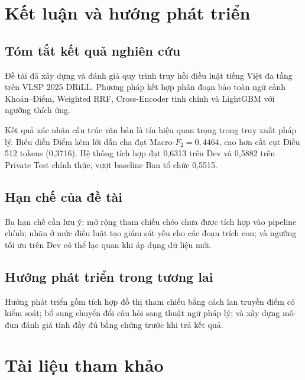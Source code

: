 \documentclass[12pt,a4paper]{article}
\begin{document}
\section{Kết luận và hướng phát triển}

\subsection{Tóm tắt kết quả nghiên cứu}
Đề tài đã xây dựng và đánh giá quy trình truy hồi điều luật tiếng Việt đa tầng trên VLSP 2025 DRiLL. Phương pháp kết hợp phân đoạn bảo toàn ngữ cảnh Khoản--Điểm, Weighted RRF, Cross-Encoder tinh chỉnh và LightGBM với ngưỡng thích ứng.

Kết quả xác nhận cấu trúc văn bản là tín hiệu quan trọng trong truy xuất pháp lý. Biểu diễn Điểm kèm lời dẫn cha đạt Macro-$F_2 = 0,4464$, cao hơn cắt cụt Điều 512 tokens (0,3716). Hệ thống tích hợp đạt 0,6313 trên Dev và 0,5882 trên Private Test chính thức, vượt baseline Ban tổ chức 0,5515.
\subsection{Hạn chế của đề tài}
Ba hạn chế cần lưu ý: mở rộng tham chiếu chéo chưa được tích hợp vào pipeline chính; nhãn ở mức điều luật tạo giám sát yếu cho các đoạn trích con; và ngưỡng tối ưu trên Dev có thể lạc quan khi áp dụng dữ liệu mới.

\subsection{Hướng phát triển trong tương lai}
Hướng phát triển gồm tích hợp đồ thị tham chiếu bằng cách lan truyền điểm có kiểm soát; bổ sung chuyển đổi câu hỏi sang thuật ngữ pháp lý; và xây dựng mô-đun đánh giá tính đầy đủ bằng chứng trước khi trả kết quả.

\begingroup
\setlength{\parskip}{0pt}
\section*{Tài liệu tham khảo}
\end{document}

